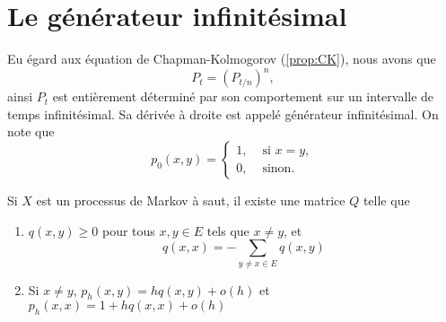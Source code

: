\begin{ex}
\end{ex}
\section{Le générateur infinitésimal}
Eu égard aux équation de Chapman-Kolmogorov (\cf \cref{prop:CK}), nous avons que 
$$
P_t = (P_{t/n})^n,
$$
ainsi $P_t$ est entièrement déterminé par son comportement sur un intervalle de temps infinitésimal. Sa dérivée à droite est appelé générateur infinitésimal. On note que 
$$
p_0(x,y) = \begin{cases}
1,&\text{ si }x=y,\\
0,& \text{ sinon.}
\end{cases}
$$ 
\begin{theo}\label{theo:infinitesimal_generator}
Si $X$ est un processus de Markov à saut, il existe une matrice $Q$ telle que 
\begin{enumerate}
	\item $q(x,y)\geq 0$ pour tous $x,y\in E$ tels que $x\neq y$, et 
	$$
	q(x,x) = -\sum_{y\neq x \in E}q(x,y)
	$$
	\item Si $x\neq y$, $p_h(x,y) = hq(x,y) + o(h)$ et $p_h(x,x) = 1 + hq(x,x) + o(h)$
\end{enumerate}
\end{theo}
